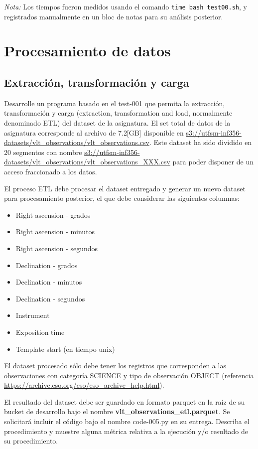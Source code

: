 \documentclass[12pt,letterpaper,twoside]{article}
\begin{document}
\textit{Nota:} Los tiempos fueron medidos usando el comando \texttt{time bash test00.sh}, y registrados manualmente en un bloc de notas para su análisis posterior.

\section{Procesamiento de datos}

\subsection{Extracción, transformación y carga}

{\color{red} Desarrolle un programa basado en el test-001 que permita la extracción, transformación y carga (extraction, transformation and load, normalmente denominado ETL) del dataset de la asignatura. El set total de datos de la asignatura corresponde al archivo de 7.2[GB] disponible en \url{s3://utfsm-inf356-datasets/vlt_observations/vlt_observations.csv}. Este dataset ha sido dividido en 20 segmentos con nombre \url{s3://utfsm-inf356-datasets/vlt\_observations/vlt_observations_XXX.csv} para poder disponer de un acceso fraccionado a los datos.

    El proceso ETL debe procesar el dataset entregado y generar un nuevo dataset para procesamiento posterior, el que debe considerar las siguientes columnas:
    \begin{itemize}
        \item Right ascension - grados
        \item Right ascension - minutos
        \item Right ascension - segundos
        \item Declination - grados
        \item Declination - minutos
        \item Declination - segundos
        \item Instrument
        \item Exposition time
        \item Template start (en tiempo unix)
    \end{itemize}

    El dataset procesado sólo debe tener los registros que corresponden a las observaciones con categoría  SCIENCE y tipo de observación OBJECT (referencia \url{https://archive.eso.org/eso/eso_archive_help.html}).

    El resultado del dataset debe ser guardado en formato parquet en la raíz de su bucket de desarrollo bajo el nombre \textbf{vlt\_observations\_etl.parquet}. Se solicitará incluir el código bajo el nombre code-005.py en su entrega. Describa el procedimiento y muestre alguna métrica relativa a la ejecución y/o resultado de su procedimiento.}
\end{document}
